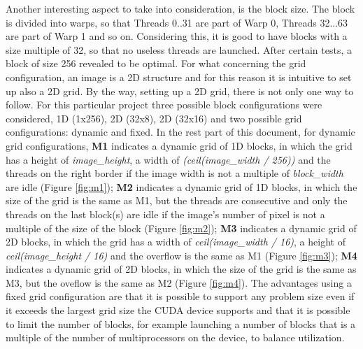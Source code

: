 \documentclass[a4paper]{article}
\begin{document}
Another interesting aspect to take into consideration, is the block size. The block is divided into warps, so that Threads 0..31 are part of Warp 0, Threads 32...63 are part of Warp 1 and so on. Considering this, it is good to have blocks with a size multiple of 32, so that no useless threads are launched. After certain tests, a block of size 256 revealed to be optimal. For what concerning the grid configuration, an image is a 2D structure and for this reason it is intuitive to set up also a 2D grid. By the way, setting up a 2D grid, there is not only one way to follow. For this particular project three possible block configurations were considered, 1D (1x256), 2D (32x8), 2D (32x16) and two possible grid configurations: dynamic and fixed. In the rest part of this document, for dynamic grid configurations, \textbf{M1} indicates a dynamic grid of 1D blocks, in which the grid has a height of \textit{image\_height}, a width of \textit{(ceil(image\_width / 256))} and the threads on the right border if the image width is not a multiple of \textit{block\_width} are idle (Figure \ref{fig:m1}); \textbf{M2} indicates a dynamic grid of 1D blocks, in which the size of the grid is the same as M1, but the threads are consecutive and only the threads on the last block(s) are idle if the image's number of pixel is not a multiple of the size of the block (Figure \ref{fig:m2}); \textbf{M3} indicates a dynamic grid of 2D blocks, in which the grid has a width of \textit{ceil(image\_width / 16)}, a height of \textit{ceil(image\_height / 16)} and the overflow is the same as M1 (Figure \ref{fig:m3}); \textbf{M4} indicates a dynamic grid of 2D blocks, in which the size of the grid is the same as M3, but the oveflow is the same as M2 (Figure \ref{fig:m4}). The advantages using a fixed grid configuration are that it is possible to support any problem size even if it exceeds the largest grid size the CUDA device supports and that it is possible to limit the number of blocks, for example launching a number of blocks that is a multiple of the number of multiprocessors on the device, to balance utilization.
\end{document}

